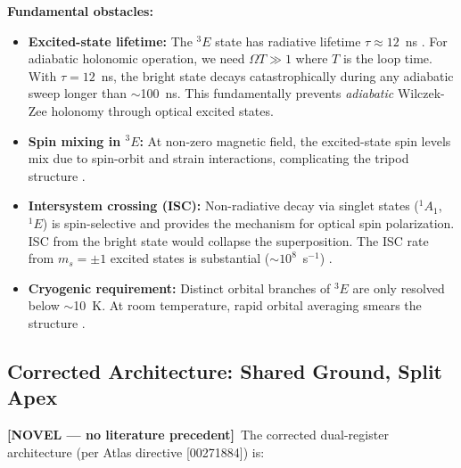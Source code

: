 \documentclass[11pt,letterpaper]{article}
\newcommand{\novel}{\textcolor{purple!70!black}{\textbf{[NOVEL --- no literature precedent]}}}
\begin{document}
\medskip
\noindent\textbf{Fundamental obstacles:}
\begin{itemize}[leftmargin=*]
    \item \textbf{Excited-state lifetime:} The $^3E$ state has radiative lifetime $\tau \approx 12$~ns \cite{Doherty2013}. %
        For adiabatic holonomic operation, we need $\Omega T \gg 1$ where $T$ is the loop time. With $\tau = 12$~ns, the bright state decays catastrophically during any adiabatic sweep longer than $\sim$100~ns. This fundamentally prevents \emph{adiabatic} Wilczek-Zee holonomy through optical excited states.
    \item \textbf{Spin mixing in $^3E$:} At non-zero magnetic field, the excited-state spin levels mix due to spin-orbit and strain interactions, complicating the tripod structure \cite{Doherty2013}.
    \item \textbf{Intersystem crossing (ISC):} Non-radiative decay via singlet states ($^1A_1$, $^1E$) is spin-selective and provides the mechanism for optical spin polarization. ISC from the bright state would collapse the superposition. The ISC rate from $m_s = \pm 1$ excited states is substantial ($\sim 10^8$~s$^{-1}$) \cite{Doherty2013}. %
    \item \textbf{Cryogenic requirement:} Distinct orbital branches of $^3E$ are only resolved below $\sim$10~K. At room temperature, rapid orbital averaging smears the structure \cite{Yale2016}. %
\end{itemize}

\medskip
\noindent{}

\subsection{Corrected Architecture: Shared Ground, Split Apex}

\novel\ The corrected dual-register architecture (per Atlas directive [00271884]) is:
\end{document}

